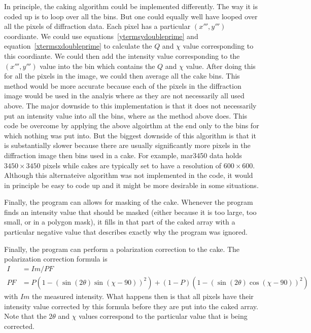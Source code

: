 In principle, the caking algorithm could be implemented
differently. The way it is coded up is to loop over
all the bins. But one could equally well have looped over
all the pixels of diffraction data. Each pixel has a
particular $(x''',y''')$ coordiante. We could use
equations~\ref{ytermsydoubleprime} and
equation~\ref{xtermsxdoubleprime} to calculate the $Q$
and $\chi$ value corresponding to this coordiante. We
could then add the intensity value corresponding to the
$(x''',y''')$ value into the bin which contains the
$Q$ and $\chi$ value. After doing this for all the pixels
in the image, we could then average all the cake bins.
This method would be more accurate because each of the 
pixels in the diffraction image would be used in the analyis
where as they are not necessarily all used above. The major
downside to this implementation is that it does not 
necessarily put an intensity value into all the bins, where 
as the method above does. This code be overcome by applying
the above algoirthm at the end only to the bins for which
nothing was put into. But the biggest downside of this 
algorithm is that it is substantially slower because there
are usually significantly more pixels in the diffraction
image then bins used in a cake. For example, mar3450 data
holds $3450\times 3450$ pixels while cakes are typically set
to have a resolution of $600\times 600$. Although
this alternateive algorithm was not implemented in the code,
it would in principle be easy to code up and it might
be more desirable in some situations.

Finally, the program can allows for masking of the cake.
Whenever the program finds an intensity value
that should be masked (either because it is too 
large, too small, or in a polygon mask), it fills
in that part of the caked array with a particular 
negative value that describes exactly why the
program was ignored.

Finally, the program can perform a polarization 
correction to the cake. The polarization 
correction formula is
\begin{align}
    I&=Im/PF \\ 
    PF&=P(1 - (\sin(2\theta)\sin(\chi-90))^2) + 
    (1 - P)(1 - (\sin(2\theta)\cos(\chi-90))^2)
\end{align}
with $Im$ the measured intensity. What happens
then is that all pixels have their intensity
value corrected by this formula before they
are put into the caked array. Note that the 
$2\theta$ and $\chi$
values correspond to the particular value
that is being corrected.

